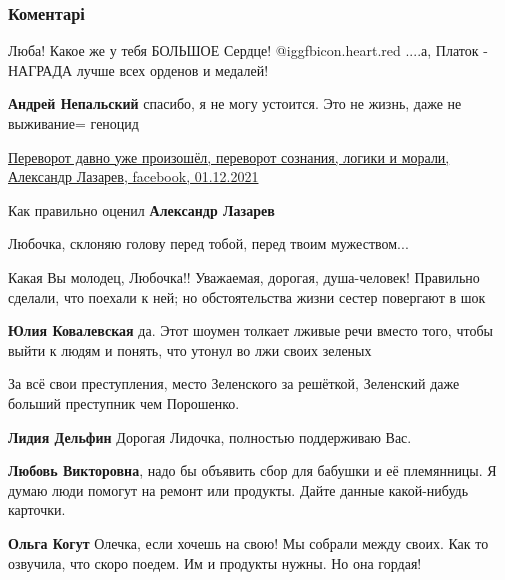  
 
 
 
 
\subsubsection{Коментарі}
\label{sec:01_12_2021.fb.titarenko_lubov.1.babushka_galja.cmt}

\begin{itemize} %

Люба! Какое же у тебя БОЛЬШОЕ Сердце! @igg{fbicon.heart.red}
....а, Платок - НАГРАДА лучше всех орденов и медалей!

\textbf{Андрей Непальский} спасибо, я не могу устоится. Это не жизнь, даже не выживание= геноцид


\href{https://www.facebook.com/100008532614385/posts/2735352603425800/}{%
Переворот давно уже произошёл, переворот сознания, логики и морали, Александр Лазарев, facebook, %
01.12.2021%
}

Как правильно оценил \textbf{Александр Лазарев}

Любочка, склоняю голову перед тобой, перед твоим мужеством...

Какая Вы молодец, Любочка!! Уважаемая, дорогая, душа-человек! Правильно сделали, что поехали к ней; но обстоятельства жизни сестер повергают в шок

\textbf{Юлия Ковалевская} да.
Этот шоумен толкает лживые речи вместо того, чтобы выйти к людям и понять, что утонул во лжи своих зеленых

За всё свои преступления, место Зеленского за решёткой, Зеленский даже больший преступник чем Порошенко.

\textbf{Лидия Дельфин} Дорогая Лидочка, полностью поддерживаю Вас.

\textbf{Любовь Викторовна}, надо бы объявить сбор для бабушки и её племянницы. Я думаю люди помогут на ремонт или продукты. Дайте данные какой-нибудь карточки.

\begin{itemize} %
\textbf{Ольга Когут} Олечка, если хочешь на свою! Мы собрали между своих. Как то озвучила, что скоро поедем.
Им и продукты нужны. Но она гордая!


\end{itemize}
\end{itemize}
